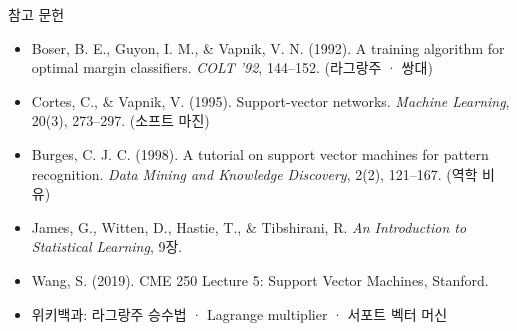 \documentclass[aspectratio=169,11pt,t]{beamer}
\newcommand{\paperlink}[1]{\href{#1}{\textcolor{ksablue}{\faLink}}}
\begin{document}
\begin{frame}{참고 문헌}
\vfill
\small
\begin{itemize}
\setlength{\itemsep}{0.45em}
\item Boser, B. E., Guyon, I. M., \& Vapnik, V. N. (1992). A training algorithm for optimal margin classifiers. \textit{COLT '92}, 144--152. \;(라그랑주 · 쌍대) \paperlink{https://doi.org/10.1145/130385.130401}
\item Cortes, C., \& Vapnik, V. (1995). Support-vector networks. \textit{Machine Learning}, 20(3), 273--297. \;(소프트 마진) \paperlink{https://doi.org/10.1007/BF00994018}
\item Burges, C. J. C. (1998). A tutorial on support vector machines for pattern recognition. \textit{Data Mining and Knowledge Discovery}, 2(2), 121--167. \;(역학 비유) \paperlink{https://doi.org/10.1023/A:1009715923555}
\item James, G., Witten, D., Hastie, T., \& Tibshirani, R. \textit{An Introduction to Statistical Learning}, 9장. \paperlink{https://doi.org/10.1007/978-1-0716-1418-1}
\item Wang, S. (2019). CME 250 Lecture 5: Support Vector Machines, Stanford. \paperlink{https://web.stanford.edu/class/cme250/files/cme250_lecture5.pdf}
\item 위키백과: 라그랑주 승수법 \paperlink{https://ko.wikipedia.org/wiki/\%EB\%9D\%BC\%EA\%B7\%B8\%EB\%9E\%91\%EC\%A3\%BC_\%EC\%8A\%B9\%EC\%88\%98\%EB\%B2\%95} \;·\; Lagrange multiplier \paperlink{https://en.wikipedia.org/wiki/Lagrange_multiplier} \;·\; 서포트 벡터 머신 \paperlink{https://ko.wikipedia.org/wiki/\%EC\%84\%9C\%ED\%8F\%AC\%ED\%8A\%B8_\%EB\%B2\%A1\%ED\%84\%B0_\%EB\%A8\%B8\%EC\%8B\%A0}
\end{itemize}
\vfill
{}
\end{frame}
\end{document}
